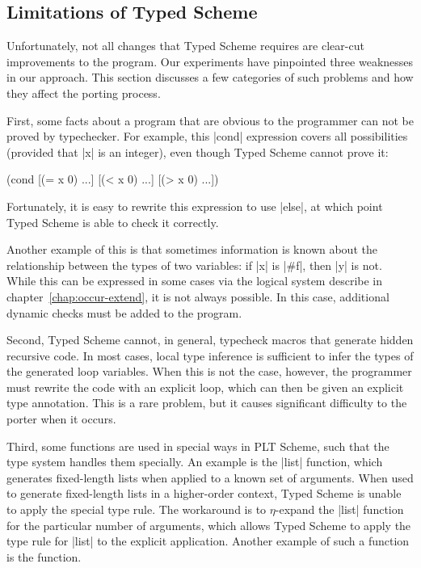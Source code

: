 \begin{schemeregion}
\subsection{Limitations of Typed Scheme}

Unfortunately, not all changes that Typed Scheme requires
are clear-cut improvements to the program.  Our experiments have
pinpointed three weaknesses in our approach.  This section
discusses a few categories of such problems and how they affect the
porting process.


First, some facts about a program that are obvious to the programmer
can  not be proved by typechecker.  For example, this
\scheme|cond| expression covers all possibilities (provided that
\scheme|x| is an integer), even though Typed
Scheme cannot prove it:
\begin{schemedisplay}
(cond [(= x 0) ...]
      [(< x 0) ...]
      [(> x 0) ...])
\end{schemedisplay}
\noindent
Fortunately, it is easy to rewrite this expression to use
\scheme|else|, at which point Typed Scheme is able to check it
correctly.  

Another example of this is that sometimes information is known
about the relationship between the types of two variables: if
\scheme|x| is \scheme|#f|, then \scheme|y| is not.  While this can be
expressed in some cases via the logical system describe in
chapter~\ref{chap:occur-extend}, it is not always possible.  In this
case, additional dynamic checks must be added to the program.  

Second, Typed Scheme cannot, in general, typecheck macros that
 generate hidden recursive code. In most cases, local type
inference is sufficient to infer the types of the generated loop
variables.  When this is not the case, however, the programmer must
rewrite the code with an explicit loop, which can then be given an
explicit type annotation.  This is a rare problem,
but it causes significant difficulty to the porter when it occurs.  

Third, some functions are used in special ways in PLT Scheme, such
that the type system handles them specially.  An example is the
\scheme|list| function, which generates fixed-length lists when
applied to a known set of arguments.  When used to generate
fixed-length lists in a higher-order context, Typed Scheme is unable
to apply the special type rule.  The workaround is to $\eta$-expand
the \scheme|list| function for the particular number of arguments,
which allows Typed Scheme to apply the type rule for \scheme|list| to
the explicit application.  Another example of such a function is the
{} function.


\end{schemeregion}
